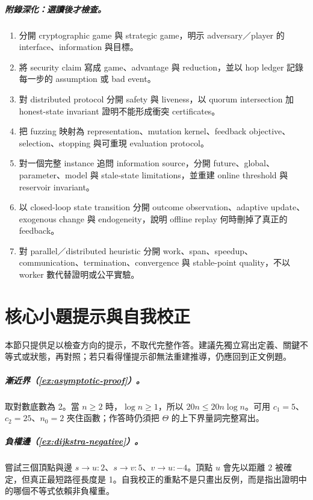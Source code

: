 \documentclass[11pt,a4paper,oneside,openany]{book}
\begin{document}
\paragraph{附錄深化：選讀後才檢查。}
\begin{enumerate}[label={\(\circ\)},leftmargin=2em]
\item 分開 cryptographic game 與 strategic game，明示 adversary／player 的 interface、information 與目標。
\item 將 security claim 寫成 game、advantage 與 reduction，並以 hop ledger 記錄每一步的 assumption 或 bad event。
\item 對 distributed protocol 分開 safety 與 liveness，以 quorum intersection 加 honest-state invariant 證明不能形成衝突 certificates。
\item 把 fuzzing 映射為 representation、mutation kernel、feedback objective、selection、stopping 與可重現 evaluation protocol。
\item 對一個完整 instance 追問 information source，分開 future、global、parameter、model 與 stale-state limitations，並重建 online threshold 與 reservoir invariant。
\item 以 closed-loop state transition 分開 outcome observation、adaptive update、exogenous change 與 endogeneity，說明 offline replay 何時刪掉了真正的 feedback。
\item 對 parallel／distributed heuristic 分開 work、span、speedup、communication、termination、convergence 與 stable-point quality，不以 worker 數代替證明或公平實驗。
\end{enumerate}

\chapter*{核心小題提示與自我校正}
本節只提供足以檢查方向的提示，不取代完整作答。建議先獨立寫出定義、關鍵不等式或狀態，再對照；若只看得懂提示卻無法重建推導，仍應回到正文例題。

\paragraph{漸近界（\cref{ex:asymptotic-proof}）。}
取對數底數為 2。當 $n\ge2$ 時，$\log n\ge1$，所以 $20n\le20n\log n$。可用 $c_1=5$、$c_2=25$、$n_0=2$ 夾住函數；作答時仍須把 $\Theta$ 的上下界量詞完整寫出。

\paragraph{負權邊（\cref{ex:dijkstra-negative}）。}
嘗試三個頂點與邊 $s\to u:2$、$s\to v:5$、$v\to u:-4$。頂點 $u$ 會先以距離 2 被確定，但真正最短路徑長度是 1。自我校正的重點不是只畫出反例，而是指出證明中的哪個不等式依賴非負權重。
\end{document}
